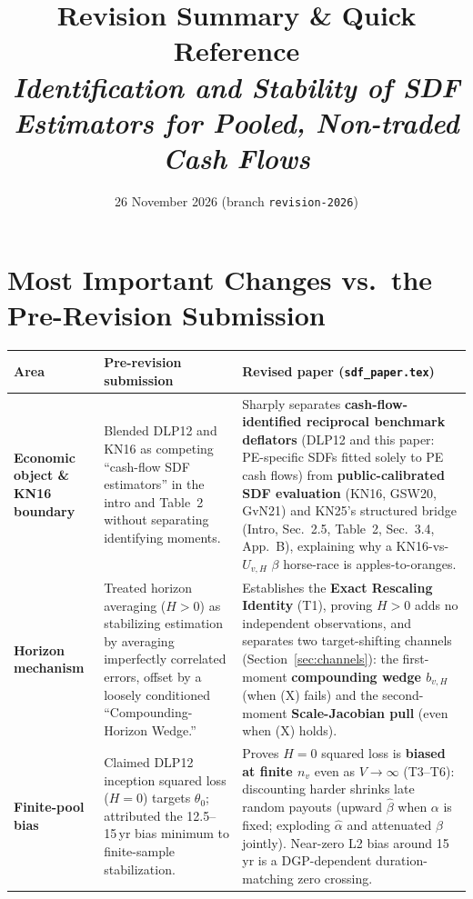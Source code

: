 \documentclass[10.5pt]{article}
\title{\vspace{-1.2em}\textbf{Revision Summary \& Quick Reference}\\[0.3ex]
\large \emph{Identification and Stability of SDF Estimators for Pooled, Non-traded Cash Flows}}
\author{}
\date{26 November 2026 (branch \texttt{revision-2026})}
\renewcommand{\arraystretch}{1.12}
\begin{document}
{\let\newpage\relax\maketitle}
\vspace{-1.8em}

\section{Most Important Changes vs.\ the Pre-Revision Submission}

{\footnotesize
\renewcommand{\arraystretch}{1.06}
\begin{tabularx}{\textwidth}{@{}>{\raggedright\arraybackslash}p{2.4cm} X X@{}}
\toprule
\textbf{Area} & \textbf{Pre-revision submission} & \textbf{Revised paper (\texttt{sdf\_paper.tex})} \\
\midrule
\textbf{Economic object \& KN16 boundary} &
  Blended DLP12 and KN16 as competing ``cash-flow SDF estimators'' in the intro and Table~2 without separating identifying moments. &
  Sharply separates \textbf{cash-flow-identified reciprocal benchmark deflators} (DLP12 and this paper: PE-specific SDFs fitted solely to PE cash flows) from \textbf{public-calibrated SDF evaluation} (KN16, GSW20, GvN21) and KN25's structured bridge (Intro, Sec.~2.5, Table~2, Sec.~3.4, App.~B), explaining why a KN16-vs-$U_{v,H}$ $\beta$ horse-race is apples-to-oranges. \\
\addlinespace[2pt]
\textbf{Horizon mechanism} &
  Treated horizon averaging ($H>0$) as stabilizing estimation by averaging imperfectly correlated errors, offset by a loosely conditioned ``Compounding-Horizon Wedge.'' &
  Establishes the \textbf{Exact Rescaling Identity} (T1), proving $H>0$ adds no independent observations, and separates two target-shifting channels (Section~\ref{sec:channels}): the first-moment \textbf{compounding wedge $b_{v,H}$} (when (X) fails) and the second-moment \textbf{Scale-Jacobian pull} (even when (X) holds). \\
\addlinespace[2pt]
\textbf{Finite-pool bias} &
  Claimed DLP12 inception squared loss ($H=0$) targets $\theta_0$; attributed the 12.5--15\,yr bias minimum to finite-sample stabilization. &
  Proves $H=0$ squared loss is \textbf{biased at finite $n_v$} even as $V\to\infty$ (T3--T6): discounting harder shrinks late random payouts (upward $\hat\beta$ when $\alpha$ is fixed; exploding $\hat\alpha$ and attenuated $\hat\beta$ jointly). Near-zero L2 bias around 15\,yr is a DGP-dependent duration-matching zero crossing. \\

\end{tabularx}}
\end{document}
